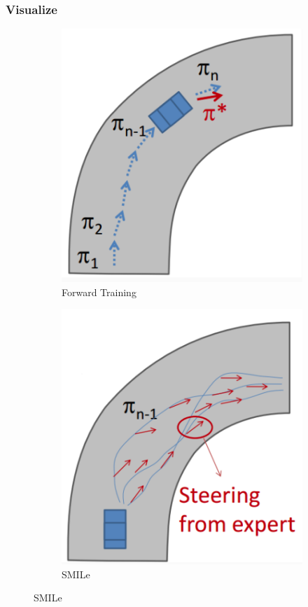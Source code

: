 \documentclass[11pt,xcolor={dvipsnames},hyperref={pdftex,pdfpagemode=UseNone,hidelinks,pdfdisplaydoctitle=true},usepdftitle=false]{beamer}
\begin{document}
\begin{frame}
\frametitle{Visualize}
\begin{figure}[ht]
    \centering
    \begin{subfigure}[b]{0.3\textwidth}
        \centering
        \includegraphics[width=\textwidth]{figs/forward.png}
        \caption{{\small Forward Training}}
        \label{fig:forward}
    \end{subfigure}
    \begin{subfigure}[b]{0.3\textwidth}
        \centering
        \includegraphics[width=\textwidth]{figs/smile.png}
        \caption{{\small SMILe}}
        \label{fig:smile}
    \end{subfigure}
    

\end{figure}
\end{frame}
\end{document}
